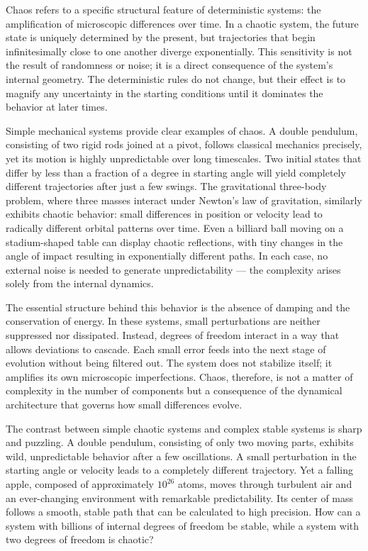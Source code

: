 Chaos refers to a specific structural feature of deterministic systems: the amplification of microscopic differences over time. In a chaotic system, the future state is uniquely determined by the present, but trajectories that begin infinitesimally close to one another diverge exponentially. This sensitivity is not the result of randomness or noise; it is a direct consequence of the system’s internal geometry. The deterministic rules do not change, but their effect is to magnify any uncertainty in the starting conditions until it dominates the behavior at later times.

Simple mechanical systems provide clear examples of chaos. A double pendulum, consisting of two rigid rods joined at a pivot, follows classical mechanics precisely, yet its motion is highly unpredictable over long timescales. Two initial states that differ by less than a fraction of a degree in starting angle will yield completely different trajectories after just a few swings. The gravitational three-body problem, where three masses interact under Newton’s law of gravitation, similarly exhibits chaotic behavior: small differences in position or velocity lead to radically different orbital patterns over time. Even a billiard ball moving on a stadium-shaped table can display chaotic reflections, with tiny changes in the angle of impact resulting in exponentially different paths. In each case, no external noise is needed to generate unpredictability — the complexity arises solely from the internal dynamics.

The essential structure behind this behavior is the absence of damping and the conservation of energy. In these systems, small perturbations are neither suppressed nor dissipated. Instead, degrees of freedom interact in a way that allows deviations to cascade. Each small error feeds into the next stage of evolution without being filtered out. The system does not stabilize itself; it amplifies its own microscopic imperfections. Chaos, therefore, is not a matter of complexity in the number of components but a consequence of the dynamical architecture that governs how small differences evolve.


The contrast between simple chaotic systems and complex stable systems is sharp and puzzling. A double pendulum, consisting of only two moving parts, exhibits wild, unpredictable behavior after a few oscillations. A small perturbation in the starting angle or velocity leads to a completely different trajectory. Yet a falling apple, composed of approximately $10^{26}$ atoms, moves through turbulent air and an ever-changing environment with remarkable predictability. Its center of mass follows a smooth, stable path that can be calculated to high precision. How can a system with billions of internal degrees of freedom be stable, while a system with two degrees of freedom is chaotic?

